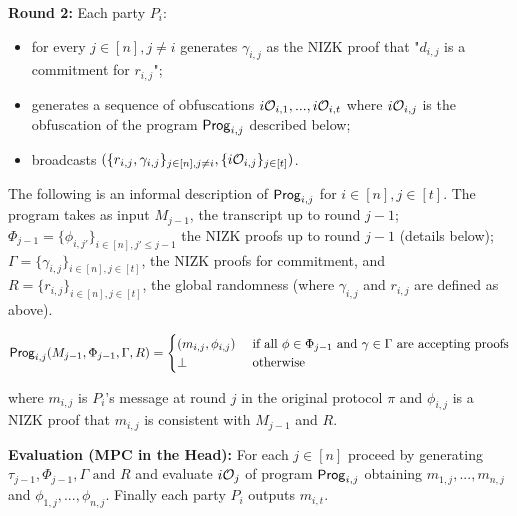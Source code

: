 \noindent
\textbf{Round 2:} Each party $P_i$:
\begin{itemize}
	\item for every $j \in [n], j \not = i$ generates $\gamma_{i,j}$ as the NIZK proof that "$d_{i,j}$ is a commitment for $r_{i,j}$";
	\item generates a sequence of obfuscations $i\mathcal{O}_{i,1},...,i\mathcal{O}_{i,t}$ where $i\mathcal{O}_{i,j}$ is the obfuscation of the program $\mathsf{Prog}_{i,j}$ described below;
	\item broadcasts $( \{ r_{i,j}, \gamma_{i,j} \}_{j \in [n], j \not = i}, \{ i\mathcal{O}_{i,j} \}_{j \in [t]})$.
\end{itemize}

\noindent
The following is an informal description of $\mathsf{Prog}_{i,j}$ for $i \in [n], j \in [t]$.
The program takes as input $M_{j-1}$, the transcript up to round $j-1$; $\Phi_{j-1} = \{\phi_{i,j'} \}_{i \in [n], j' \leq j-1}$ the NIZK proofs up to round $j-1$ (details below); $\Gamma = \{ \gamma_{i,j} \}_{i \in [n],j \in [t]}$, the NIZK proofs for commitment, and $R = \{ r_{i,j} \}_{i \in [n],j \in [t]}$, the global randomness (where $\gamma_{i,j}$ and $r_{i,j}$ are defined as above).

\[
\Prog_{i,j}(M_{j-1}, \Phi_{j-1}, \Gamma, R) =
\begin{cases} 
\hfill (m_{i,j}, \phi_{i,j})    \hfill & \text{ if all $\phi \in \Phi_{j-1}$ and $\gamma \in \Gamma$ are accepting proofs} \\
\bot \hfill & \text{ otherwise } \\
\end{cases}
\]

where $m_{i,j}$ is $P_i$'s message at round $j$ in the original protocol $\pi$ and $\phi_{i,j}$ is a NIZK proof that $m_{i,j}$ is consistent with $M_{j-1}$ and $R$.

\noindent
\textbf{Evaluation (MPC in the Head):} For each $j \in [n]$ proceed by generating $\tau_{j-1}, \Phi_{j-1}, \Gamma \mbox{ and } R$ and evaluate $i\mathcal{O}_j$ of program $\mathsf{Prog}_{i,j}$ obtaining $m_{1,j},...,m_{n,j}$
and $\phi_{1,j},...,\phi_{n,j}$. Finally each party $P_i$ outputs $m_{i,t}$.



